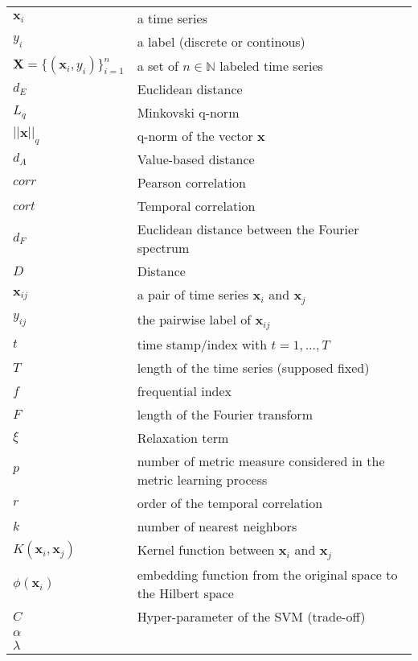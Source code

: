 \begin{tabular}{ll}
	$\textbf{x}_i$ 							& a time series \\ 
	$y_i$ 									& a label (discrete or continous) \\
	$\textbf{X} = \{(\textbf{x}_i , y_i)\}_{i=1}^n$ & a set of $n \in \mathbb{N}$ labeled time series \\
	$d_E$		& Euclidean distance \\
	$L_q$		& Minkovski q-norm \\
	$||\textbf{x}||_q$	& q-norm of the vector $\textbf{x}$ \\
	$d_A$		& Value-based distance \\
	$corr$  	& Pearson correlation \\
	$cort$  	& Temporal correlation \\
	$d_F$   	& Euclidean distance between the Fourier spectrum \\
	$D$ 		& Distance \\
	$\textbf{x}_{ij}$ 	& a pair of time series $\textbf{x}_i$ and $\textbf{x}_j$ \\
	$y_{ij}$			& the pairwise label of $\textbf{x}_{ij}$ \\
	$t$			& time stamp/index with $t=1,...,T$ \\
	$T$			& length of the time series (supposed fixed) \\
	$f$			& frequential index \\	
	$F$			& length of the Fourier transform \\
	$\xi$		& Relaxation term \\
	$p$			& number of metric measure considered in the metric learning 	process \\
	$r$			& order of the temporal correlation \\
	$k$			& number of nearest neighbors \\
	$K(\textbf{x}_i,\textbf{x}_j)$ & Kernel function between $\textbf{x}_i$ and $\textbf{x}_j$ \\
	$\phi(\textbf{x}_i)$ & embedding function from the original space to the Hilbert space  \\
	$C$ 		& Hyper-parameter of the SVM (trade-off)\\ 
	$\alpha$	& \\
	$\lambda$	& \\
\end{tabular} 




